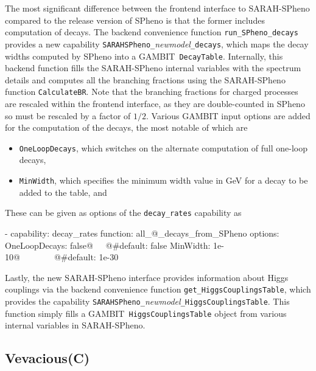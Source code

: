 \documentclass[pdftex,twocolumn,epjc3_preprint,runningheads]{svjour3}
\renewcommand{\_}{\discretionary{\underscore}{}{\underscore}}
\newcommand\cpp[1]{{\lstinline!#1!}}  %
\newcommand\fortran[1]{{\lstset{style=fortran}\lstinline!#1!\lstset{style=cpp}}}
\newcommand{\metavarf}[1]{\textit{\color{darkgreen}\footnotesize\textrm{#1}}}
\newcommand{\metavar}{\metavarf}
\newcommand{\gambit}{\textsf{GAMBIT}\xspace}
\newcommand{\GB}{\gambit}
\newcommand{\sarah}{\textsf{SARAH}\xspace}
\newcommand{\veva}{\textsf{Vevacious}\xspace}
\newcommand{\spheno}{\textsf{SPheno}\xspace}
\newcommand\xx{\raisebox{0.2ex}{\smaller ++}\xspace}
\newcommand{\nm}{\metavar{new\_model}}
\begin{document}
The most significant difference between the frontend interface to \sarah-\spheno compared to the release version of \spheno is that the former includes computation of decays. The backend convenience function \cpp{run_SPheno_decays} provides a new capability \cpp{SARAHSPheno_}\nm\cpp{_decays}, which maps the decay widths computed by \spheno into a \GB\ \cpp{DecayTable}. Internally, this backend function fills the \sarah-\spheno internal variables with the spectrum details and computes all the branching fractions using the \sarah-\spheno function \fortran{CalculateBR}. Note that the branching fractions for charged processes are rescaled within the frontend interface, as they are double-counted in \spheno so must be rescaled by a factor of $1/2$. Various \GB input options are added for the computation of the decays, the most notable of which are \begin{itemize}
\item \fortran{OneLoopDecays}, which switches on the alternate computation of full one-loop decays,
\item \fortran{MinWidth}, which specifies the minimum width value in GeV for a decay to be added to the table, and
\end{itemize}
These can be given as options of the \cpp{decay_rates} capability as
%
\begin{lstyaml}
  - capability: decay_rates
    function: all_@\nm@_decays_from_SPheno
    options:
      OneLoopDecays: false@\ \ \ @#default: false
      MinWidth: 1e-10@\ \ \ \ \ \ \ \ @#default: 1e-30
\end{lstyaml}

Lastly, the new \sarah-\spheno interface provides information about Higgs couplings via the backend convenience function \cpp{get_HiggsCouplingsTable}, which provides the capability \cpp{SARAHSPheno_}\nm\cpp{_HiggsCouplingsTable}. This function simply fills a \GB\ \cpp{HiggsCouplingsTable} object from various internal variables in \sarah-\spheno.

\subsection{\veva (C\xx)} \label{app:vevacious}
\end{document}

